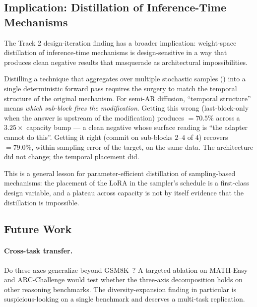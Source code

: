 \subsection{Implication: Distillation of Inference-Time Mechanisms}

The Track 2 design-iteration finding has a broader implication:
weight-space distillation of inference-time mechanisms is
design-sensitive in a way that produces clean negative results
that masquerade as architectural impossibilities.

Distilling a technique that aggregates over multiple stochastic
samples (\cmaj{}) into a single deterministic forward pass
requires the surgery to match the temporal structure of the
original mechanism.  For semi-AR diffusion, ``temporal structure''
means \emph{which sub-block fires the modification}.  Getting this
wrong (last-block-only when the answer is upstream of the
modification) produces \ctwoc{} $= 70.5\%$ across a $3.25\times$
capacity bump --- a clean negative whose surface reading is ``the
adapter cannot do this''.  Getting it right (commit on sub-blocks
$2$--$4$ of $4$) recovers \ctwoc{} $= 79.0\%$, within sampling
error of the target, on the same data.  The architecture did not
change; the temporal placement did.

This is a general lesson for parameter-efficient distillation of
sampling-based mechanisms: the placement of the LoRA in the
sampler's schedule is a first-class design variable, and a
plateau across capacity is not by itself evidence that the
distillation is impossible.

\subsection{Future Work}

\paragraph{Cross-task transfer.}  Do these axes generalize beyond
GSM8K~\citep{cobbe2021gsm8k}?  A targeted ablation on MATH-Easy
and ARC-Challenge would test whether the three-axis decomposition
holds on other reasoning benchmarks.  The diversity-expansion
finding in particular is suspicious-looking on a single benchmark
and deserves a multi-task replication.

